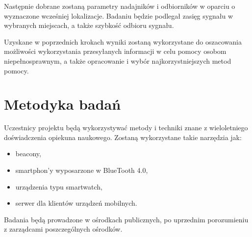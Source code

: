 \documentclass[a4paper]{article}
\begin{document}
Następnie dobrane zostaną parametry nadajników i odbiorników w oparciu o wyznaczone wcześniej lokalizacje. Badaniu będzie podlegał zasięg sygnału w wybranych miejscach, a także szybkość odbioru sygnału. 

Uzyskane w poprzednich krokach wyniki zostaną wykorzystane do oszacowania możliwości wykorzystania przesyłanych informacji w celu pomocy osobom niepełnosprawnym, a także opracowanie i wybór najkorzystniejszych metod pomocy.

\section{Metodyka badań}
Uczestnicy projektu będą wykorzystywać metody i techniki znane z wieloletniego doświadczenia opiekuna naukowego. Zostaną wykorzystane takie narzędzia jak:
\begin{itemize}
\item beacony,
\item smartphon'y wyposarzone w BlueTooth 4.0,
\item urządzenia typu smartwatch,
\item serwer dla klientów urządzeń mobilnych.
\end{itemize} 

Badania będą prowadzone w ośrodkach publicznych, po uprzednim porozumieniu z zarządcami poszczególnych ośrodków.
\end{document}
